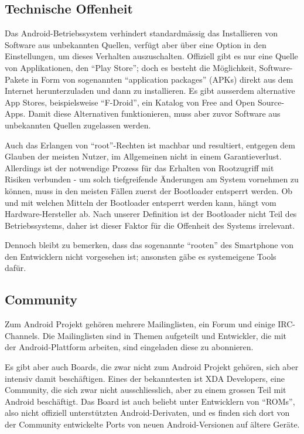 \subsection{Technische Offenheit}
Das Android-Betriebssystem verhindert standardmässig das Installieren von Software aus unbekannten Quellen, verfügt aber über eine Option in den Einstellungen, um dieses Verhalten auszuschalten. Offiziell gibt es nur eine Quelle von Applikationen, den ``Play Store''; doch es besteht die Möglichkeit, Software-Pakete in Form von sogenannten ``application packages'' (APKs) direkt aus dem Internet herunterzuladen und dann zu installieren. Es gibt ausserdem alternative App Stores, beispielsweise ``F-Droid'', ein Katalog von Free and Open Source-Apps\cite{online:f-droid}. Damit diese Alternativen funktionieren, muss aber zuvor Software aus unbekannten Quellen zugelassen werden.

Auch das Erlangen von ``root''-Rechten ist machbar und resultiert, entgegen dem Glauben der meisten Nutzer, im Allgemeinen nicht in einem Garantieverlust\cite{online:xda-rooting-warranty}. Allerdings ist der notwendige Prozess für das Erhalten von Rootzugriff mit Risiken verbunden - um solch tiefgreifende Änderungen am System vornehmen zu können, muss in den meisten Fällen zuerst der Bootloader entsperrt werden. 
Ob und mit welchen Mitteln der Bootloader entsperrt werden kann, hängt vom Hardware-Hersteller ab\cite{online:apu-what-is-unlocking}. Nach unserer Definition ist der Bootloader nicht Teil des Betriebssystems, daher ist dieser Faktor für die Offenheit des Systems irrelevant.

Dennoch bleibt zu bemerken, dass das sogenannte ``rooten'' des Smartphone von den Entwicklern nicht vorgesehen ist; ansonsten gäbe es systemeigene Tools dafür.\\

\subsection{Community}
Zum Android Projekt gehören mehrere Mailinglisten, ein Forum und einige IRC-Channels\cite{online:android-community}. Die Mailinglisten sind in Themen aufgeteilt und Entwickler, die mit der Android-Plattform arbeiten, sind eingeladen diese zu abonnieren\cite{online:android-community}.

Es gibt aber auch Boards, die zwar nicht zum Android Projekt gehören, sich aber intensiv damit beschäftigen. Eines der bekanntesten ist XDA Developers\cite{online:xda-developers}, eine Community, die sich zwar nicht ausschliesslich, aber zu einem grossen Teil mit Android beschäftigt. Das Board ist auch beliebt unter Entwicklern von ``ROMs'', also nicht offiziell unterstützten Android-Derivaten, und es finden sich dort von der Community entwickelte Ports von neuen Android-Versionen auf ältere Geräte.\\

